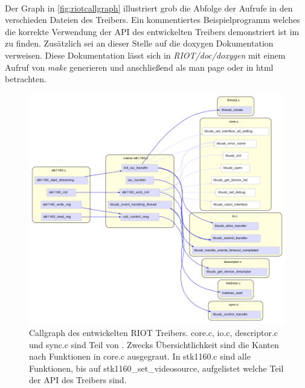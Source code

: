 \paragraph{}
Der Graph in \autoref{fig:riotcallgraph} illustriert grob die Abfolge der Aufrufe in den verschieden Dateien des Treibers. Ein kommentiertes Beispielprogramm welches die korrekte Verwendung der API des entwickelten Treibers demonstriert ist im \projectsrepo{} zu finden. Zusätzlich sei an dieser Stelle auf die doxygen Dokumentation verweisen. Diese Dokumentation lässt sich in \emph{RIOT/doc/doxygen} mit einem Aufruf von \emph{make} generieren und anschließend als man page oder in html betrachten.
\begin{figure}[htbp]
 \centering
 \includegraphics[scale=0.63]{./ClusterCallButterflyGraph-native-stk1160-c-highlighted.png}
 \caption{Callgraph des entwickelten RIOT Treibers. core.c, io.c, descriptor.c und sync.c sind Teil von \libusb{}. Zwecks Übersichtlichkeit sind die Kanten nach Funktionen in core.c ausgegraut. In stk1160.c sind alle Funktionen, bis auf stk1160\_set\_videosource, aufgelistet welche Teil der API des Treibers sind.}
 \label{fig:riotcallgraph}
\end{figure}
\restoregeometry
